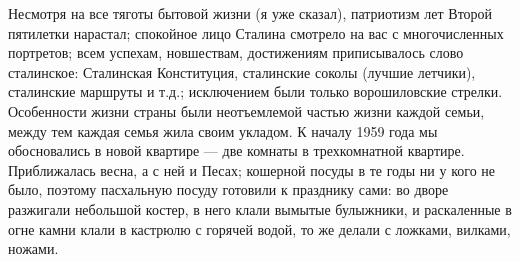 \label{178-1}
Несмотря на все тяготы бытовой жизни (я уже сказал), патриотизм лет Второй пятилетки нарастал; спокойное лицо Сталина смотрело на вас с многочисленных портретов; всем успехам, новшествам, достижениям приписывалось слово сталинское: Сталинская Конституция, сталинские соколы (лучшие летчики), сталинские маршруты и т.д.; исключением были только ворошиловские стрелки. Особенности жизни страны были неотъемлемой частью жизни каждой семьи, между тем каждая семья жила своим укладом. К началу 1959 года мы обосновались в новой квартире — две комнаты в трехкомнатной квартире. Приближалась весна, а с ней и Песах; кошерной посуды в те годы ни у кого не было, поэтому пасхальную посуду готовили к празднику сами: во дворе разжигали небольшой костер, в него клали вымытые булыжники, и раскаленные в огне камни клали в кастрюлю с горячей водой, то же делали с ложками, вилками, ножами.